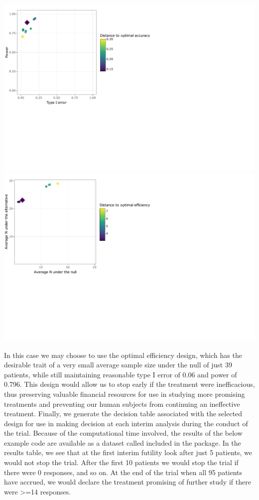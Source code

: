 \begin{Schunk}

\includegraphics{zabor-hobbs-kane_files/figure-latex/unnamed-chunk-7-1} 
\includegraphics{zabor-hobbs-kane_files/figure-latex/unnamed-chunk-7-2} \end{Schunk}

In this case we may choose to use the optimal efficiency design, which
has the desirable trait of a very small average sample size under the
null of just 39 patients, while still maintaining reasonable type I
error of 0.06 and power of 0.796. This design would allow us to stop
early if the treatment were inefficacious, thus preserving valuable
financial resources for use in studying more promising treatments and
preventing our human subjects from continuing an ineffective treatment.
Finally, we generate the decision table associated with the selected
design for use in making decision at each interim analysis during the
conduct of the trial. Because of the computational time involved, the
results of the below example code are available as a dataset called
 included in the  package.
In the results table, we see that at the first interim futility look
after just 5 patients, we would not stop the trial. After the first 10
patients we would stop the trial if there were 0 responses, and so on.
At the end of the trial when all 95 patients have accrued, we would
declare the treatment promising of further study if there were
\textgreater=14 responses.

